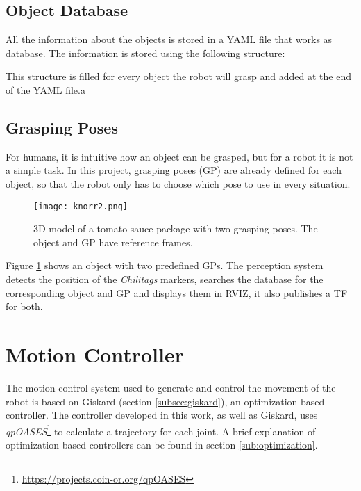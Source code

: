 \subsection{Object Database}
\label{sec:db}
All the information about the objects is stored in a YAML file that works as database. The information is stored using the following structure:



This structure is filled for every object the robot will grasp and added at the end of the YAML file.a

\subsection{Grasping Poses}

For humans, it is intuitive how an object can be grasped, but for a robot it is not a simple task. In this project, grasping poses (GP) are already defined for each object, so that the robot only has to choose which pose to use in every situation.
\begin{figure}[H]
	\centering
		{\texttt{[image: knorr2.png]}}
	\vspace{-12pt}
	\caption[Grasping poses]{3D model of a tomato sauce package with two grasping poses. The object and GP have reference frames.}
	\vspace{-10pt}
	\label{fig:knorr}
\end{figure}

Figure \ref{fig:knorr} shows an object with two predefined GPs. The perception system detects the position of the \textit{Chilitags} markers, searches the database for the corresponding object and GP and displays them in RVIZ, it also publishes a TF for both.


\section{Motion Controller}
\label{sec:motion_controller}

The motion control system used  to generate and control the movement of the robot is based on Giskard (section \ref{subsec:giskard}), an optimization-based controller. The controller developed in this work, as well as Giskard, uses \textit{qpOASES}\footnote{\url{https://projects.coin-or.org/qpOASES}}  to calculate a trajectory for each joint. A brief explanation of optimization-based controllers can be found in section \ref{sub:optimization}.

